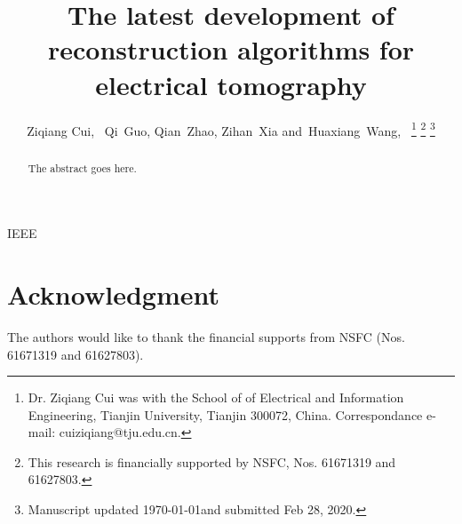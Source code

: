 \documentclass[journal, twocolumn]{IEEEtran}
\begin{document}
\title{The latest development of reconstruction algorithms for electrical tomography}


\author{
  Ziqiang Cui,~
  Qi~Guo, Qian~Zhao, Zihan~Xia
  and~Huaxiang~Wang,~%
\thanks{Dr. Ziqiang Cui was with the School of
of Electrical and Information Engineering, Tianjin University, Tianjin 300072, China.
Correspondance e-mail: cuiziqiang@tju.edu.cn.}%
\thanks{This research is financially supported by NSFC, Nos. 61671319 and 61627803.}%
\thanks{Manuscript updated \today and submitted Feb 28, 2020.}}

\maketitle

\begin{abstract}
The abstract goes here.
\end{abstract}

\begin{IEEEkeywords}
IEEE
\end{IEEEkeywords}


\IEEEpeerreviewmaketitle









%

\section*{Acknowledgment}

The authors would like to thank the financial supports from NSFC (Nos. 61671319 and 61627803).

\ifCLASSOPTIONcaptionsoff
  \newpage
\fi





% 
\end{document}
